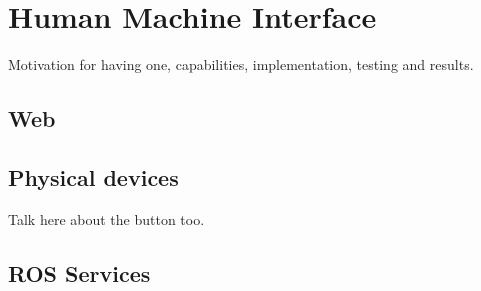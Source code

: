 \section{Human Machine Interface} %
\label{sec:mr_human_machine_interface}

Motivation for having one, capabilities, implementation, testing and results.

	\subsection{Web} %
	\label{sub:mr_web}


	\subsection{Physical devices} %
	\label{sub:mr_physical_devices}
	Talk here about the button too.


	\subsection{ROS Services} %
	\label{sub:mr_ros_services}


